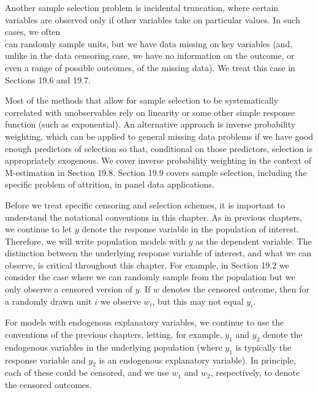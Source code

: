 \documentclass[10pt]{article}
\begin{document}
Another sample selection problem is incidental truncation, where certain variables are observed only if other variables take on particular values. In such cases, we often\\
can randomly sample units, but we have data missing on key variables (and, unlike in the data censoring case, we have no information on the outcome, or even a range of possible outcomes, of the missing data). We treat this case in Sections 19.6 and 19.7.

Most of the methods that allow for sample selection to be systematically correlated with unobservables rely on linearity or some other simple response function (such as exponential). An alternative approach is inverse probability weighting, which can be applied to general missing data problems if we have good enough predictors of selection so that, conditional on those predictors, selection is appropriately exogenous. We cover inverse probability weighting in the context of M-estimation in Section 19.8. Section 19.9 covers sample selection, including the specific problem of attrition, in panel data applications.

Before we treat specific censoring and selection schemes, it is important to understand the notational conventions in this chapter. As in previous chapters, we continue to let $y$ denote the response variable in the population of interest. Therefore, we will write population models with $y$ as the dependent variable. The distinction between the underlying response variable of interest, and what we can observe, is critical throughout this chapter. For example, in Section 19.2 we consider the case where we can randomly sample from the population but we only observe a censored version of $y$. If $w$ denotes the censored outcome, then for a randomly drawn unit $i$ we observe $w_{i}$, but this may not equal $y_{i}$.

For models with endogenous explanatory variables, we continue to use the conventions of the previous chapters, letting, for example, $y_{1}$ and $y_{2}$ denote the endogenous variables in the underlying population (where $y_{1}$ is typically the response variable and $y_{2}$ is an endogenous explanatory variable). In principle, each of these could be censored, and we use $w_{1}$ and $w_{2}$, respectively, to denote the censored outcomes.
\end{document}

